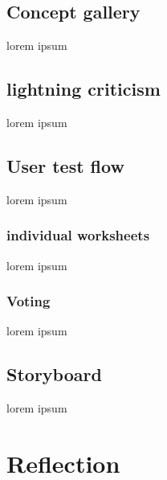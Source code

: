 \documentclass[12pt]{article}
\begin{document}
\subsection{Concept gallery}
lorem ipsum
\subsection{lightning criticism}
lorem ipsum
\subsection{User test flow}
lorem ipsum
\subsubsection{individual worksheets}
lorem ipsum
\subsubsection{Voting}
lorem ipsum
\subsection{Storyboard}
lorem ipsum

\section{Reflection}



\printbibliography
\end{document}
